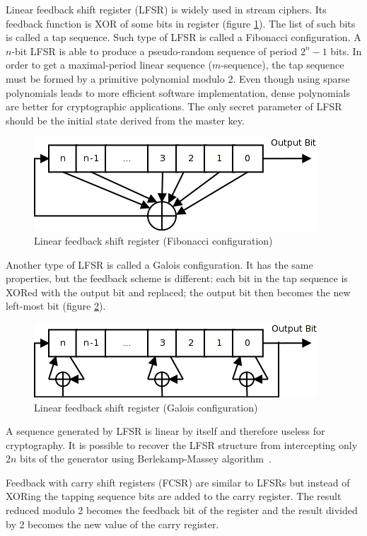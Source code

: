 Linear feedback shift register (LFSR) is widely used in stream ciphers. Its
feedback function is XOR of some bits in register (figure
\ref{fig:lfsr-fib}).  The list of such bits is called a tap sequence. Such type
of LFSR is called a Fibonacci configuration. A $n$-bit LFSR is able to produce a
pseudo-random sequence of period $2^n - 1$ bits. In order to get a
maximal-period linear sequence ($m$-sequence), the tap sequence must be formed
by a primitive polynomial modulo 2. Even though using sparse polynomials leads
to more efficient software implementation, dense polynomials are better for
cryptographic applications. The only secret parameter of LFSR should be the
initial state derived from the master key.
\begin{figure}[htbp]
    \centering
    \includegraphics[scale=0.5]{images/lfsr}
    \caption{Linear feedback shift register (Fibonacci configuration)}
    \label{fig:lfsr-fib}
\end{figure}
Another type of LFSR is called a Galois configuration. It has the same
properties, but the feedback scheme is different: each bit in the tap sequence
is XORed with the output bit and replaced; the output bit then becomes the new
left-most bit (figure \ref{fig:lfsr-galois}).
\begin{figure}[htbp]
    \centering
    \includegraphics[scale=0.5]{images/lfsr_galois}
    \caption{Linear feedback shift register (Galois configuration)}
    \label{fig:lfsr-galois}
\end{figure}
A sequence generated by LFSR is linear by itself and therefore useless for
cryptography. It is possible to recover the LFSR structure from intercepting
only $2n$ bits of the generator using Berlekamp-Massey algorithm~\cite{joux:algorithmic_cryptanalysis}.

Feedback with carry shift registers (FCSR) are similar to LFSRs but instead of
XORing the tapping sequence bits are added to the carry register. The result
reduced modulo 2 becomes the feedback bit of the register and the result divided
by 2 becomes the new value of the carry register.

